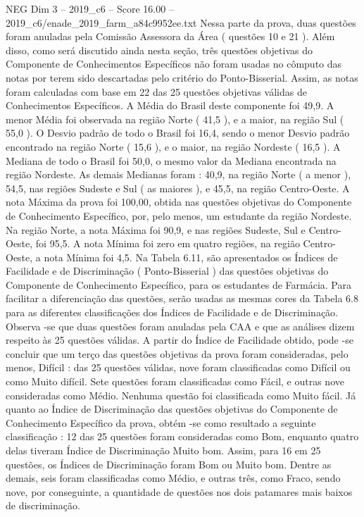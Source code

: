 \begin{textsample}{NEG Dim 3 – 2019\_c6 – Score 16.00 – 2019\_c6/enade\_2019\_farm\_a84c9952ee.txt}
Nessa parte da prova, duas questões foram anuladas pela Comissão Assessora da Área ( questões 10 e 21 ).
Além disso, como será discutido ainda nesta seção, três questões objetivas do Componente de Conhecimentos Específicos não foram usadas no cômputo das notas por terem sido descartadas pelo critério do Ponto-Bisserial.
Assim, as notas foram calculadas com base em 22 das 25 questões objetivas válidas de Conhecimentos Específicos.
A Média do Brasil deste componente foi 49,9.
A menor Média foi observada na região Norte ( 41,5 ), e a maior, na região Sul ( 55,0 ).
O Desvio padrão de todo o Brasil foi 16,4, sendo o menor Desvio padrão encontrado na região Norte ( 15,6 ), e o maior, na região Nordeste ( 16,5 ).
A Mediana de todo o Brasil foi 50,0, o mesmo valor da Mediana encontrada na região Nordeste.
As demais Medianas foram : 40,9, na região Norte ( a menor ), 54,5, nas regiões Sudeste e Sul ( as maiores ), e 45,5, na região Centro-Oeste.
A nota Máxima da prova foi 100,00, obtida nas questões objetivas do Componente de Conhecimento Específico, por, pelo menos, um estudante da região Nordeste.
Na região Norte, a nota Máxima foi 90,9, e nas regiões Sudeste, Sul e Centro-Oeste, foi 95,5.
A nota Mínima foi zero em quatro regiões, na região Centro-Oeste, a nota Mínima foi 4,5.
Na Tabela 6.11, são apresentados os Índices de Facilidade e de Discriminação ( Ponto-Bisserial ) das questões objetivas do Componente de Conhecimento Específico, para os estudantes de Farmácia.
Para facilitar a diferenciação das questões, serão usadas as mesmas cores da Tabela 6.8 para as diferentes classificações dos Índices de Facilidade e de Discriminação.
Observa -se que duas questões foram anuladas pela CAA e que as análises dizem respeito às 25 questões válidas.
A partir do Índice de Facilidade obtido, pode -se concluir que um terço das questões objetivas da prova foram consideradas, pelo menos, Difícil : das 25 questões válidas, nove foram classificadas como Difícil ou como Muito difícil.
Sete questões foram classificadas como Fácil, e outras nove consideradas como Médio.
Nenhuma questão foi classificada como Muito fácil.
Já quanto ao Índice de Discriminação das questões objetivas do Componente de Conhecimento Específico da prova, obtém -se como resultado a seguinte classificação : 12 das 25 questões foram consideradas como Bom, enquanto quatro delas tiveram Índice de Discriminação Muito bom.
Assim, para 16 em 25 questões, os Índices de Discriminação foram Bom ou Muito bom.
Dentre as demais, seis foram classificadas como Médio, e outras três, como Fraco, sendo nove, por conseguinte, a quantidade de questões nos dois patamares mais baixos de discriminação.

\end{textsample}
